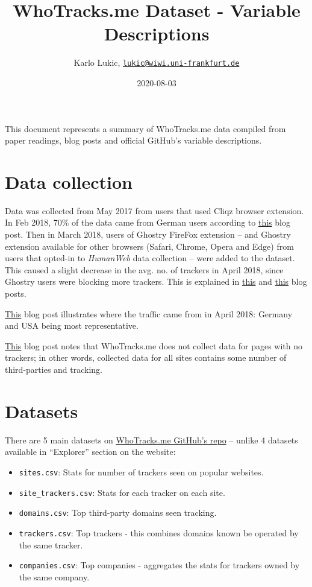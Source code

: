 \documentclass[
]{article}
\title{WhoTracks.me Dataset - Variable Descriptions}
\author{Karlo Lukic,
\href{mailto:lukic@wiwi.uni-frankfurt.de}{\nolinkurl{lukic@wiwi.uni-frankfurt.de}}}
\date{2020-08-03}
\providecommand{\tightlist}{%
  \setlength{\itemsep}{0pt}\setlength{\parskip}{0pt}}
\begin{document}
\maketitle

This document represents a summary of WhoTracks.me data compiled from
paper readings, blog posts and official GitHub's variable descriptions.

\hypertarget{data-collection}{%
\section{Data collection}\label{data-collection}}

Data was collected from May 2017 from users that used Cliqz browser
extension. In Feb 2018, 70\% of the data came from German users
according to \href{https://t.ly/NQcD}{this} blog post. Then in March
2018, users of Ghostry FireFox extension -- and Ghostry extension
available for other browsers (Safari, Chrome, Opera and Edge) from users
that opted-in to \emph{HumanWeb} data collection -- were added to the
dataset. This caused a slight decrease in the avg. no. of trackers in
April 2018, since Ghostry users were blocking more trackers. This is
explained in \href{https://bit.ly/2VIBndZ}{this} and
\href{https://t.ly/BoCm}{this} blog posts.

\href{https://t.ly/BoCm}{This} blog post illustrates where the traffic
came from in April 2018: Germany and USA being most representative.

\href{https://bit.ly/2SJG2fj}{This} blog post notes that WhoTracks.me
does not collect data for pages with no trackers; in other words,
collected data for all sites contains some number of third-parties and
tracking.

\hypertarget{datasets}{%
\section{Datasets}\label{datasets}}

There are 5 main datasets on \href{https://bit.ly/39wiim0}{WhoTracks.me
GitHub's repo} -- unlike 4 datasets available in ``Explorer'' section on
the website:

\begin{itemize}
\tightlist
\item
  \texttt{sites.csv}: Stats for number of trackers seen on popular
  websites.
\item
  \texttt{site\_trackers.csv}: Stats for each tracker on each site.
\item
  \texttt{domains.csv}: Top third-party domains seen tracking.
\item
  \texttt{trackers.csv}: Top trackers - this combines domains known be
  operated by the same tracker.
\item
  \texttt{companies.csv}: Top companies - aggregates the stats for
  trackers owned by the same company.
\end{itemize}
\end{document}
